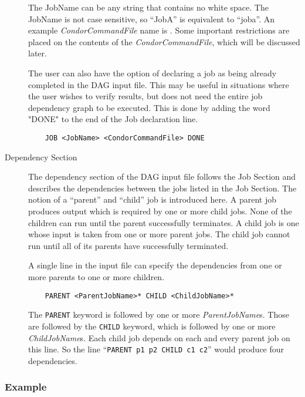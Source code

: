 \begin{description}
The JobName can be any string that contains no white space.  The JobName is
not case sensitive, so ``JobA'' is equivalent to ``joba''.  An example
\textit{CondorCommandFile} name is .  Some important
restrictions are placed on the contents of the \textit{CondorCommandFile},
which will be discussed later.

The user can also have the option of declaring a job as being already
completed in the DAG input file. This may be useful in situations where the
user wishes to verify results, but does not need the entire job dependency
graph to be executed. This is done by adding the word "DONE" to the end of the
Job declaration line.

\begin{verbatim}
	JOB <JobName> <CondorCommandFile> DONE
\end{verbatim}

\item[Dependency Section]

The dependency section of the DAG input file follows the Job Section and
describes the dependencies between the jobs listed in the Job Section.  The
notion of a ``parent'' and ``child'' job is introduced here.  A parent job
produces output which is required by one or more child jobs.  None of the
children can run until the parent successfully terminates.  A child job is one
whose input is taken from one or more parent jobs.  The child job cannot run
until all of its parents have successfully terminated.

A single line in the input file can specify the dependencies from one or more
parents to one or more children.

\begin{verbatim}
	PARENT <ParentJobName>* CHILD <ChildJobName>*
\end{verbatim}

The \texttt{PARENT} keyword is followed by one or more
\textit{ParentJobName}s.  Those are followed by the \texttt{CHILD} keyword,
which is followed by one or more \textit{ChildJobName}s.  Each child job
depends on each and every parent job on this line.  So the line
``\texttt{PARENT p1 p2 CHILD c1 c2}'' would produce four dependencies.

\end{description}

\subsubsection{Example}


